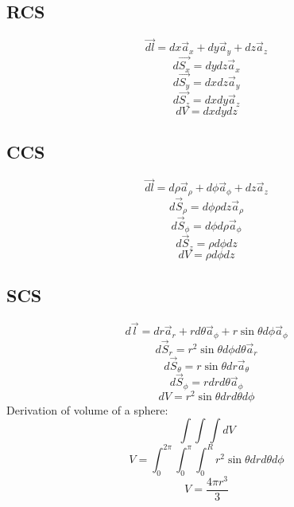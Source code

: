         \subsection{RCS}
            
            $$\vec{dl} = dx\vec{a}_x + dy\vec{a}_y + dz\vec{a}_z$$
            $$d\vec{S_x} = dydz\vec{a}_x$$
            $$d\vec{S_y} = dxdz\vec{a}_y$$
            $$d\vec{S_z} = dxdy\vec{a}_z$$
            $$dV = dxdydz$$
        \subsection{CCS}
            
            $$\vec{dl} = d\rho\vec{a}_\rho + d\phi\vec{a}_\phi + dz\vec{a}_z$$
            $$d\vec{S}_\rho = d\phi\rho dz\vec{a}_\rho$$
            $$d\vec{S}_\phi = d\phi d\rho\vec{a}_\phi$$
            $$d\vec{S}_z = \rho d\phi dz$$
            $$dV = \rho d\phi dz$$
        \subsection{SCS}
            
            $$d\vec{l}=dr\vec{a}_r + rd\theta\vec{a}_\phi + r\sin\theta d\phi\vec{a}_\phi$$
            $$d\vec{S}_r = r^2\sin\theta d\phi d\theta \vec{a}_r$$
            $$d\vec{S}_\theta = r\sin\theta dr\vec{a}_\theta$$
            $$d\vec{S}_\phi = rdrd\theta\vec{a}_\phi$$
            $$dV = r^2\sin\theta drd\theta d\phi$$
            Derivation of volume of a sphere:
            $$\int\int\int dV$$
            $$V = \int_{0}^{2\pi}\int_{0}^{\pi}\int_{0}^{R}r^2\sin\theta drd\theta d\phi$$
            $$V = \frac{4\pi{r}^3}{3}$$
